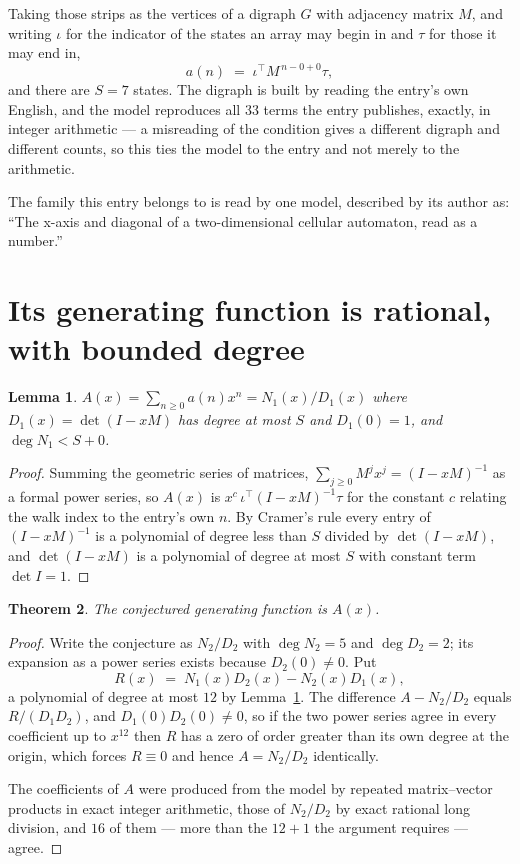 \documentclass[11pt,a4paper]{article}
\theoremstyle{plain}
\newtheorem{theorem}{Theorem}
\newtheorem{lemma}[theorem]{Lemma}
\theoremstyle{definition}
\begin{document}
Taking those strips as the vertices of a digraph $G$ with adjacency matrix $M$, and writing
$\iota$ for the indicator of the states an array may begin in and $\tau$ for those it may end
in,
\[
a(n)\;=\;\iota^{\!\top}M^{\,n-0+0}\tau ,
\]
and there are $S=7$ states. The digraph is built by reading the entry's own English, and the
model reproduces all $33$ terms the entry publishes, exactly, in integer arithmetic --- a
misreading of the condition gives a different digraph and different counts, so this ties the
model to the entry and not merely to the arithmetic.

The family this entry belongs to is read by one model, described by its author as: ``The x-axis and diagonal of a two-dimensional cellular automaton, read as a number.''


\section{Its generating function is rational, with bounded degree}

\begin{lemma}\label{lem:rat}
$A(x)=\sum_{n\ge0}a(n)x^n=N_1(x)/D_1(x)$ where $D_1(x)=\det(I-xM)$ has degree at most
$S$ and $D_1(0)=1$, and $\deg N_1<S+0$.
\end{lemma}

\begin{proof}
Summing the geometric series of matrices, $\sum_{j\ge0}M^jx^j=(I-xM)^{-1}$ as a formal
power series, so $A(x)$ is $x^{c}\,\iota^{\!\top}(I-xM)^{-1}\tau$ for the constant $c$
relating the walk index to the entry's own $n$. By Cramer's rule every entry of
$(I-xM)^{-1}$ is a polynomial of degree less than $S$ divided by $\det(I-xM)$, and
$\det(I-xM)$ is a polynomial of degree at most $S$ with constant term $\det I=1$.
\end{proof}

\begin{theorem}
The conjectured generating function is $A(x)$.
\end{theorem}

\begin{proof}
Write the conjecture as $N_2/D_2$ with $\deg N_2=5$ and $\deg D_2=2$; its expansion as a
power series exists because $D_2(0)\neq0$. Put
\[
R(x)\;=\;N_1(x)D_2(x)-N_2(x)D_1(x),
\]
a polynomial of degree at most $12$ by Lemma~\ref{lem:rat}. The difference
$A-N_2/D_2$ equals $R/(D_1D_2)$, and $D_1(0)D_2(0)\neq0$, so if the two power series agree in
every coefficient up to $x^{12}$ then $R$ has a zero of order greater than its own
degree at the origin, which forces $R\equiv0$ and hence $A=N_2/D_2$ identically.

The coefficients of $A$ were produced from the model by repeated matrix--vector products in
exact integer arithmetic, those of $N_2/D_2$ by exact rational long division, and $16$
of them --- more than the $12+1$ the argument requires --- agree.
\end{proof}
\end{document}
